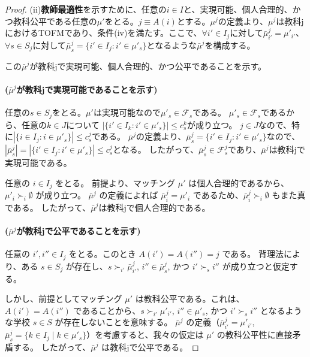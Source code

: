 \documentclass[12pt, a4paper]{article}
\theoremstyle{definition}
\theoremstyle{remark}
\theoremstyle{plain}
\begin{document}
\begin{proof}
(ii)\textbf{教師最適性}を示すために、任意の$i \in I$と、実現可能、個人合理的、かつ教科公平である任意の$\mu'$をとる。$j \equiv A(i)$とする。$\mu^j$の定義より、$\mu^j$は教科jにおけるTOFMであり、条件(iv)を満たす。ここで、$\forall i' \in I_j$に対して$\bar{\mu}^j_{i'} = \mu'_{i'}$、$\forall s \in S_j$に対して$\bar{\mu}^j_s = \{ i' \in I_j : i' \in \mu'_s\}$となるような$\bar{\mu}^j$を構成する。

この$\bar{\mu}^j$が教科jで実現可能、個人合理的、かつ公平であることを示す。

\paragraph{($\bar{\mu}^j$が教科jで実現可能であることを示す)}
任意の$s \in S_j$をとる。$\mu'$は実現可能なので$\mu'_s \in \mathcal{F}_s$である。
$\mu'_s \in \mathcal{F}_s$であるから、任意の$k \in J$について $|\{i' \in I_k : i' \in \mu'_s\}| \leq c^k_s$が成り立つ。
$j \in J$なので、特に$|\{i \in I_j : i \in \mu'_s\}| \leq c^j_s$である。
$\bar{\mu}^j$の定義より、$\bar{\mu}^j_s = \{ i' \in I_j : i' \in \mu'_s\}$なので、
$|\bar{\mu}^j_s| = |\{ i' \in I_j : i' \in \mu'_s\}| \leq c^j_s$となる。
したがって、$\bar{\mu}^j_s \in \mathcal{F}^j_s$であり、$\bar{\mu}^j$は教科jで実現可能である。

任意の $i \in I_j$ をとる。
前提より、マッチング $\mu'$ は個人合理的であるから、$\mu'_{i} \succ_{i} \emptyset$ が成り立つ。
$\bar{\mu}^j$ の定義によれば $\bar{\mu}^j_{i} = \mu'_{i}$ であるため、$\bar{\mu}^j_{i} \succ_{i} \emptyset$ もまた真である。
したがって、$\bar{\mu}^j$は教科jで個人合理的である。

\paragraph{($\bar{\mu}^j$が教科jで公平であることを示す)}
任意の $i', i'' \in I_j$ をとる。このとき $A(i')=A(i'')=j$ である。
背理法により、ある $s \in S_j$ が存在し、$s \succ_{i'} \bar{\mu}^j_{i'}$, $i'' \in \bar{\mu}^j_s$, かつ $i' \succ_s i''$ が成り立つと仮定する。

しかし、前提としてマッチング $\mu'$ は教科公平である。これは、$A(i')=A(i'')$ であることから、$s \succ_{i'} \mu'_{i'}$, $i'' \in \mu'_s$, かつ $i' \succ_s i''$ となるような学校 $s \in S$ が存在しないことを意味する。
$\bar{\mu}^j$ の定義（$\bar{\mu}^j_{i'} = \mu'_{i'}$, $\bar{\mu}^j_s = \{k \in I_j \mid k \in \mu'_s\}$）を考慮すると、我々の仮定は $\mu'$ の教科公平性に直接矛盾する。
したがって、$\bar{\mu}^j$ は教科jで公平である。


\end{proof}
\end{document}
